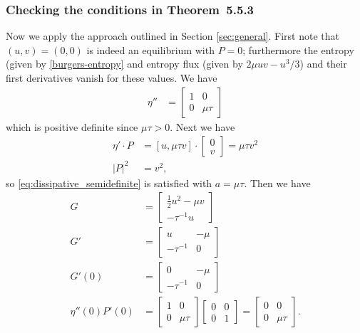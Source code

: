 \documentclass{article}
\theoremstyle{plain}
\theoremstyle{definition}
\numberwithin{theorem}{section}
\begin{document}
\subsubsection{Checking the conditions in Theorem~5.5.3}
Now we apply the approach outlined in Section \ref{sec:general}.  
First note that $(u,v) = (0,0)$ is indeed an equilibrium with $P=0$;
furthermore the entropy (given by \eqref{burgers-entropy} and entropy flux 
(given by $2\mu uv - u^3/3$) and their first derivatives vanish for these values.
We have
\begin{align}
    \eta'' & = \begin{bmatrix}
        1 & 0 \\ 0 & \mu \tau
    \end{bmatrix}
\end{align}
which is positive definite since $\mu \tau >0$.
Next we have
\begin{align}
    \eta' \cdot P & = [u, \mu \tau v] \cdot  \begin{bmatrix} 0 \\ v \end{bmatrix} = \mu \tau v^2 \\
    |P|^2 & = v^2,
\end{align}
so \eqref{eq:dissipative_semidefinite} is satisfied with $a = \mu \tau$.
Then we have
\begin{align}
    G & = \begin{bmatrix} \frac{1}{2} u^2 -\mu v \\ -\tau^{-1} u \end{bmatrix} \\
   G' & = \begin{bmatrix} u & -\mu \\ -\tau^{-1} &  0 \end{bmatrix} \\
   G'(0) & = \begin{bmatrix} 0 & -\mu \\ -\tau^{-1} &  0 \end{bmatrix} \\
   \eta''(0) P'(0) & = \begin{bmatrix} 1 & 0 \\ 0 & \mu \tau \end{bmatrix}
    \begin{bmatrix} 0 & 0 \\ 0 & 1 \end{bmatrix} = 
    \begin{bmatrix} 0 & 0 \\ 0 & \mu \tau \end{bmatrix}.
\end{align}
\end{document}
